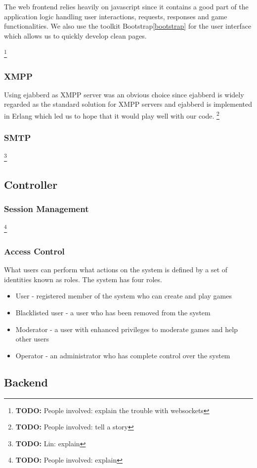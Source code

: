 \documentclass[11pt,a4paper]{report}
\newcommand{\todo}[1]{\footnote{{\color{red} {\bf TODO:} #1}}}
\begin{document}
The web frontend relies heavily on javascript since it contains a good part of the application logic handling user interactions, requests, responses and game functionalities. We also use the toolkit Bootstrap\ref{bootstrap} for the user interface which allows us to quickly develop clean pages.

\todo{People involved: explain the trouble with websockets}

\subsubsection{XMPP}
Using ejabberd as XMPP server was an obvious choice since ejabberd is widely
regarded as the standard solution for XMPP servers and ejabberd is implemented
in Erlang which led us to hope that it would play well with our code. \todo{People involved: tell a story}
\subsubsection{SMTP}
\todo{Lin: explain}

\subsection{Controller}
\subsubsection{Session Management}
\todo{People involved: explain}

\subsubsection{Access Control}
What users can perform what actions on the system is defined by a set of identities known as roles. The system has four roles.

\begin{itemize}
\item User - registered member of the system who can create and play games
\item Blacklisted user - a user who has been removed from the system
\item Moderator - a user with enhanced privileges to moderate games and help other users
\item Operator - an administrator who has complete control over the system

\end{itemize}

\subsection{Backend}
\end{document}
